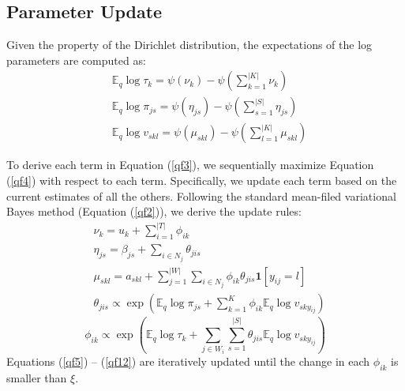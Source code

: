 \documentclass[letterpaper]{article} %
\begin{document}
\subsection{Parameter Update}
Given the property of the Dirichlet distribution, the expectations of the log parameters are computed as:
\begin{align}
  &\mathbb{E}_{q}\log\tau_{k}=\psi(\nu_{k})-\psi(\sum_{k=1}^{|K|}\nu_{k}) \label{qf5}\\
  &\mathbb{E}_{q}\log\pi_{js}=\psi(\eta_{js})-\psi(\sum_{s=1}^{|S|}\eta_{js}) \label{qf6}\\
  &\mathbb{E}_{q}\log v_{skl}=\psi(\mu_{skl})-\psi(\sum_{l=1}^{|K|}\mu_{skl})
  \label{qf7}
\end{align}

To derive each term in Equation (\ref{qf3}), we sequentially maximize Equation (\ref{qf4}) with respect to each term. Specifically, we update each term based on the current estimates of all the others. Following the standard mean-filed variational Bayes method (Equation (\ref{qf2})), we derive the update rules:
\noindent
\begin{align}
  &\nu_{k}=u_{k}+\sum_{i=1}^{|T|}\phi_{ik}  \label{qf8}\\
  &\eta_{js}=\beta_{js}+\sum_{i\in N_{j}}\theta_{jis}  \label{qf9}\\
  &\mu_{skl}=a_{skl}+\sum_{j=1}^{|W|}\sum_{i\in N_{j}}\phi_{ik}\theta_{jis}\mathbf{1}[y_{ij}=l] \label{qf10}\\
  &\theta_{jis}\propto \exp(\mathbb{E}_{q}\log\pi_{js}+\sum_{k=1}^{K}\phi_{ik}\mathbb{E}_{q}\log v_{sky_{ij}}) \label{qf11}
\end{align}
\begin{equation}
  \phi_{ik}\propto \exp(\mathbb{E}_{q}\log\tau_{k}+\sum_{j\in W_{i}}\sum_{s=1}^{|S|}\theta_{jis}\mathbb{E}_{q}\log v_{sky_{ij}})
  \label{qf12}
\end{equation}
Equations (\ref{qf5}) -- (\ref{qf12}) are iteratively updated until the change in each $\phi_{ik}$ is smaller than $\xi$.
\end{document}
